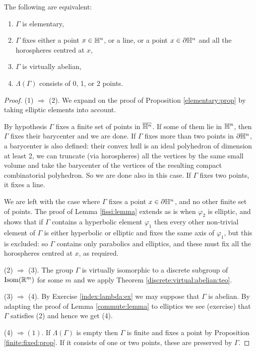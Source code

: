 \begin{prop} \label{elementary:4:prop}
The following are equivalent:
\begin{enumerate}
\item $\Gamma$ is elementary,
\item $\Gamma$ fixes either a point $x\in\mathbb{H}^n$, or a line, or a point $x\in\partial\mathbb{H}^n$ and all the horospheres centred at $x$,
\item $\Gamma$ is virtually abelian,
\item $\Lambda(\Gamma)$ consists of 0, 1, or 2 points.
\end{enumerate}
\end{prop}
\begin{proof}
(1) $\Rightarrow$ (2). We expand on the proof of Proposition \ref{elementary:prop} by taking elliptic elements into account.

By hypothesis $\Gamma$ fixes a finite set of points in $\overline{\mathbb{H}^n}$. If some of them lie in $\mathbb{H}^n$, then $\Gamma$ fixes their barycenter and we are done. If $\Gamma$ fixes more than two points in $\partial \mathbb{H}^n$, a barycenter is also defined: their convex hull is an ideal polyhedron of dimension at least 2, we can truncate (via horospheres) all the vertices by the same small volume and take the barycenter of the vertices of the resulting compact combinatorial polyhedron. So we are done also in this case. If $\Gamma$ fixes two points, it fixes a line.

We are left with the case where $\Gamma$ fixes a point $x\in \partial \mathbb{H}^n$, and no other finite set of points. The proof of Lemma \ref{fissi:lemma} extends as is when $\varphi_2$ is elliptic, and shows that if $\Gamma$ contains a hyperbolic element $\varphi_1$ then every other non-trivial element of $\Gamma$ is either hyperbolic or elliptic and fixes the same axis of $\varphi_1$, but this is excluded: so $\Gamma$ contains only parabolics and elliptics, and these must fix all the horospheres centred at $x$, as required.

(2) $\Rightarrow$ (3). The group $\Gamma$ is virtually isomorphic to a discrete subgroup of ${\rm Isom}(\mathbb{R}^m)$ for some $m$ and we apply Theorem \ref{discrete:virtual:abelian:teo}.

(3) $\Rightarrow$ (4). By Exercise \ref{index:lambda:ex} we may suppose that $\Gamma$ is abelian. By adapting the proof of Lemma \ref{commute:lemma} to elliptics we see (exercise) that $\Gamma$ satisfies (2) and hence we get (4).

(4) $\Rightarrow (1)$. If $\Lambda(\Gamma)$ is empty then $\Gamma$ is finite and fixes a point by Proposition \ref{finite:fixed:prop}.
If it consists of one or two points, these are preserved by $\Gamma$.
\end{proof}

